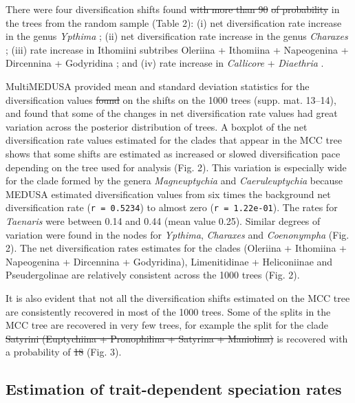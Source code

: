 \documentclass[10pt]{article}
\providecommand{\DIFaddtex}[1]{{\protect\color{blue}\uwave{#1}}} %
\providecommand{\DIFdeltex}[1]{{\protect\color{red}\sout{#1}}}                      %
\providecommand{\DIFaddbegin}{} %
\providecommand{\DIFaddend}{} %
\providecommand{\DIFdelbegin}{} %
\providecommand{\DIFdelend}{} %
\providecommand{\DIFadd}[1]{\texorpdfstring{\DIFaddtex{#1}}{#1}} %
\providecommand{\DIFdel}[1]{\texorpdfstring{\DIFdeltex{#1}}{}} %
\begin{document}
There were four diversification shifts found \DIFdelbegin \DIFdel{with more than 90}%
\DIFdel{of
probability }\DIFdelend in the trees from the
random sample (Table 2): (i) net
diversification rate increase in the genus \emph{Ypthima} \DIFaddbegin \DIFadd{($r = 0.22$)}\DIFaddend ;
(ii) net diversification rate increase in the genus \emph{Charaxes}
\DIFaddbegin \DIFadd{($r = 0.21$)}\DIFaddend ; (iii) rate increase in Ithomiini subtribes Oleriina +
Ithomiina + Napeogenina + Dircennina + Godyridina \DIFaddbegin \DIFadd{($r = 0.10$)}\DIFaddend ;
and (iv) rate increase in \emph{Callicore} + \emph{Diaethria} \DIFaddbegin \DIFadd{($r = 0.135$)}\DIFaddend .

MultiMEDUSA provided mean and standard deviation statistics for the
diversification values \DIFdelbegin \DIFdel{found }\DIFdelend on the shifts on the 1000 trees (supp. mat.
13--14), and found that some of the changes in net diversification rate
values had great variation across the posterior distribution of trees. A
boxplot of the net diversification rate values estimated for the clades
that appear in the MCC tree shows that some shifts are estimated as
increased or slowed diversification pace depending on the tree used for
analysis (Fig. 2). This variation is especially wide for the clade
formed by the genera \emph{Magneuptychia} and \emph{Caeruleuptychia}
because MEDUSA estimated diversification values from six times the
background net diversification rate (\texttt{r = 0.5234}) to almost zero
(\texttt{r = 1.22e-01}). The rates for \emph{Taenaris} were between 0.14
and 0.44 (mean value 0.25). Similar degrees of variation were found in
the nodes for \emph{Ypthima}, \emph{Charaxes} and \emph{Coenonympha}
(Fig. 2). The net diversification rates estimates for the clades
(Oleriina + Ithomiina + Napeogenina + Dircennina + Godyridina),
Limenitidinae + Heliconiinae and Pseudergolinae are relatively
consistent across the 1000 trees (Fig. 2).

It is also evident that not all the diversification shifts estimated on
the MCC tree are consistently recovered in most of the 1000 trees. Some
of the splits in the MCC tree are recovered in very few trees, for
example the split for the clade \DIFdelbegin \DIFdel{Satyrini (Euptychiina + Pronophilina +
Satyrina + Maniolina) }\DIFdelend \DIFaddbegin \DIFadd{Satyrinae }\DIFaddend is recovered with a probability
of \DIFdelbegin \DIFdel{18}%
\DIFdelend \DIFaddbegin \DIFadd{0.18 }\DIFaddend (Fig. 3).

\subsection*{Estimation of trait-dependent speciation
rates}
\end{document}
